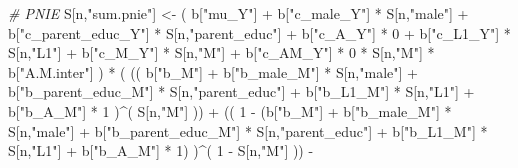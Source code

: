 \documentclass[
]{book}
\newenvironment{Shaded}{\begin{snugshade}}{\end{snugshade}}
\newcommand{\CommentTok}[1]{\textcolor[rgb]{0.56,0.35,0.01}{\textit{#1}}}
\newcommand{\DecValTok}[1]{\textcolor[rgb]{0.00,0.00,0.81}{#1}}
\newcommand{\NormalTok}[1]{#1}
\newcommand{\OtherTok}[1]{\textcolor[rgb]{0.56,0.35,0.01}{#1}}
\newcommand{\SpecialCharTok}[1]{\textcolor[rgb]{0.00,0.00,0.00}{#1}}
\newcommand{\StringTok}[1]{\textcolor[rgb]{0.31,0.60,0.02}{#1}}
\begin{document}
\begin{Shaded}
\begin{Highlighting}[]
    \CommentTok{\# PNIE }
\NormalTok{    S[n,}\StringTok{"sum.pnie"}\NormalTok{] }\OtherTok{\textless{}{-}}\NormalTok{ ( b[}\StringTok{"mu\_Y"}\NormalTok{] }\SpecialCharTok{+} 
\NormalTok{                           b[}\StringTok{"c\_male\_Y"}\NormalTok{] }\SpecialCharTok{*}\NormalTok{ S[n,}\StringTok{"male"}\NormalTok{] }\SpecialCharTok{+} 
\NormalTok{                           b[}\StringTok{"c\_parent\_educ\_Y"}\NormalTok{] }\SpecialCharTok{*}\NormalTok{ S[n,}\StringTok{"parent\_educ"}\NormalTok{] }\SpecialCharTok{+} 
\NormalTok{                           b[}\StringTok{"c\_A\_Y"}\NormalTok{] }\SpecialCharTok{*} \DecValTok{0} \SpecialCharTok{+} 
\NormalTok{                           b[}\StringTok{"c\_L1\_Y"}\NormalTok{] }\SpecialCharTok{*}\NormalTok{ S[n,}\StringTok{"L1"}\NormalTok{] }\SpecialCharTok{+}
\NormalTok{                           b[}\StringTok{"c\_M\_Y"}\NormalTok{] }\SpecialCharTok{*}\NormalTok{ S[n,}\StringTok{"M"}\NormalTok{] }\SpecialCharTok{+}
\NormalTok{                           b[}\StringTok{"c\_AM\_Y"}\NormalTok{] }\SpecialCharTok{*} \DecValTok{0} \SpecialCharTok{*}\NormalTok{ S[n,}\StringTok{"M"}\NormalTok{] }\SpecialCharTok{*}\NormalTok{ b[}\StringTok{"A.M.inter"}\NormalTok{] ) }\SpecialCharTok{*}
\NormalTok{      ( (( b[}\StringTok{"b\_M"}\NormalTok{] }\SpecialCharTok{+} 
\NormalTok{             b[}\StringTok{"b\_male\_M"}\NormalTok{] }\SpecialCharTok{*}\NormalTok{ S[n,}\StringTok{"male"}\NormalTok{] }\SpecialCharTok{+} 
\NormalTok{             b[}\StringTok{"b\_parent\_educ\_M"}\NormalTok{] }\SpecialCharTok{*}\NormalTok{ S[n,}\StringTok{"parent\_educ"}\NormalTok{] }\SpecialCharTok{+} 
\NormalTok{             b[}\StringTok{"b\_L1\_M"}\NormalTok{] }\SpecialCharTok{*}\NormalTok{ S[n,}\StringTok{"L1"}\NormalTok{] }\SpecialCharTok{+}
\NormalTok{             b[}\StringTok{"b\_A\_M"}\NormalTok{] }\SpecialCharTok{*} \DecValTok{1}\NormalTok{ )}\SpecialCharTok{\^{}}\NormalTok{( S[n,}\StringTok{"M"}\NormalTok{] )) }\SpecialCharTok{+}
\NormalTok{          (( }\DecValTok{1} \SpecialCharTok{{-}}\NormalTok{ (b[}\StringTok{"b\_M"}\NormalTok{] }\SpecialCharTok{+} 
\NormalTok{                    b[}\StringTok{"b\_male\_M"}\NormalTok{] }\SpecialCharTok{*}\NormalTok{ S[n,}\StringTok{"male"}\NormalTok{] }\SpecialCharTok{+} 
\NormalTok{                    b[}\StringTok{"b\_parent\_educ\_M"}\NormalTok{] }\SpecialCharTok{*}\NormalTok{ S[n,}\StringTok{"parent\_educ"}\NormalTok{] }\SpecialCharTok{+} 
\NormalTok{                    b[}\StringTok{"b\_L1\_M"}\NormalTok{] }\SpecialCharTok{*}\NormalTok{ S[n,}\StringTok{"L1"}\NormalTok{] }\SpecialCharTok{+}
\NormalTok{                    b[}\StringTok{"b\_A\_M"}\NormalTok{] }\SpecialCharTok{*} \DecValTok{1}\NormalTok{) )}\SpecialCharTok{\^{}}\NormalTok{( }\DecValTok{1} \SpecialCharTok{{-}}\NormalTok{ S[n,}\StringTok{"M"}\NormalTok{] )) }\SpecialCharTok{{-}}

\end{Highlighting}
\end{Shaded}
\end{document}
